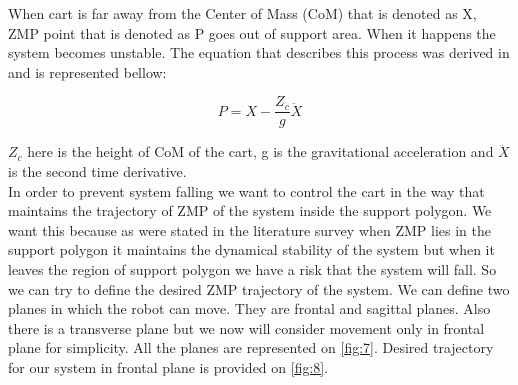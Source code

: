 \documentclass[12pt,a4paper]{report}
\begin{document}
		When cart is far away from the Center of Mass (CoM) that is denoted as X, ZMP point that is denoted as P goes out of support area. When it happens the system becomes unstable.
		The equation that describes this process was derived in \cite{kajita2003biped} and is represented bellow:
		
		\begin{equation}\label{eq:eqv1}
			P = X -\dfrac{Z_c}{g} \ddot{X}
		\end{equation}
		
		$Z_c$ here is the height of CoM of the cart, g is the gravitational acceleration and $\ddot{X}$ is the second time derivative.\\
		In order to prevent system falling we want to control the cart in the way that maintains the trajectory of ZMP of the system inside the support polygon. We want this because as were stated in the literature survey when ZMP lies in the support polygon it maintains the dynamical stability of the system but when it leaves the region of support polygon we have a risk that the system will fall. So we can try to define the desired ZMP trajectory of the system. We can define two planes in which the robot can move. They are frontal and sagittal planes. Also there is a transverse plane but we now will consider movement only in frontal plane for simplicity. All the planes are represented on \cref{fig:7}. Desired trajectory for our system in frontal plane is provided on \ref{fig:8}.
		
\end{document}
